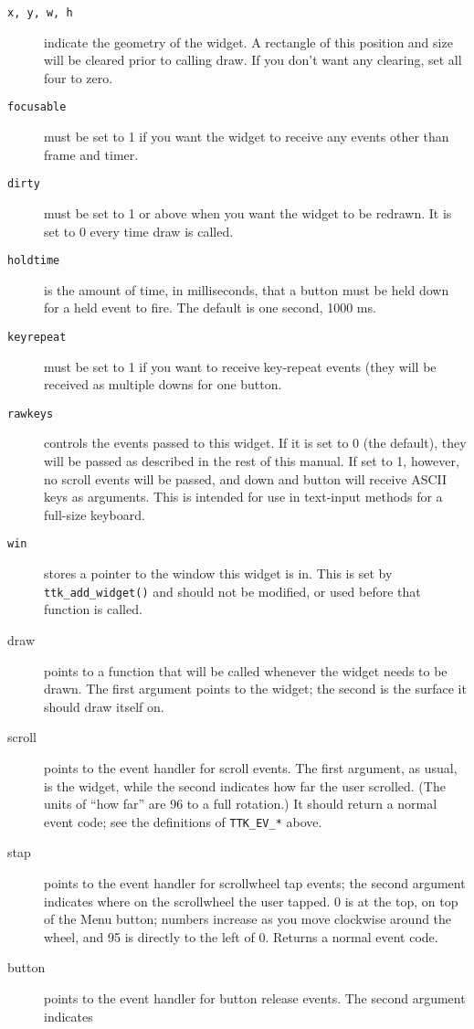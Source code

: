 \documentclass[12pt,letterpaper]{report}
\let\ttt\tt
\def\tt{\def\_{{\ttt\char`\_}}\ttt}
\begin{document}
\begin{description}
\item[{\tt x, y, w, h}] indicate the geometry of the widget. A rectangle of this position and size
will be cleared prior to calling {\sf draw}. If you don't want any clearing, set all four to zero.
\item[{\tt focusable}] must be set to 1 if you want the widget to receive any events other than
{\sf frame} and {\sf timer}.
\item[{\tt dirty}] must be set to 1 or above when you want the widget to be redrawn. It is set to 0
every time {\sf draw} is called.
\item[{\tt holdtime}] is the amount of time, in milliseconds, that a button must be held down for
a {\sf held} event to fire. The default is one second, 1000 ms.
\item[{\tt keyrepeat}] must be set to 1 if you want to receive key-repeat events (they will be
received as multiple {\sf down}s for one {\sf button}.
\item[{\tt rawkeys}] controls the events passed to this widget. If it is set to 0 (the default),
they will be passed as described in the rest of this manual. If set to 1, however, no {\sf scroll}
events will be passed, and {\sf down} and {\sf button} will receive ASCII keys as arguments. This
is intended for use in text-input methods for a full-size keyboard.
\item[{\tt win}] stores a pointer to the window this widget is in. This is set by \verb|ttk_add_widget()|
and should not be modified, or used before that function is called.
\item[{\sf draw}] points to a function that will be called whenever the widget needs to be drawn.
The first argument points to the widget; the second is the surface it should draw itself on.
\item[{\sf scroll}] points to the event handler for scroll events. The first argument, as usual, is the
widget, while the second indicates how far the user scrolled. (The units of ``how far'' are 96 to a full
rotation.) It should return a normal event code; see the definitions of \verb|TTK_EV_*| above.
\item[{\sf stap}] points to the event handler for scrollwheel tap events; the second argument indicates
where on the scrollwheel the user tapped. 0 is at the top, on top of the Menu button; numbers increase
as you move clockwise around the wheel, and 95 is directly to the left of 0. Returns a normal event code.
\item[{\sf button}] points to the event handler for button release events. The second argument indicates

\end{description}
\end{document}
